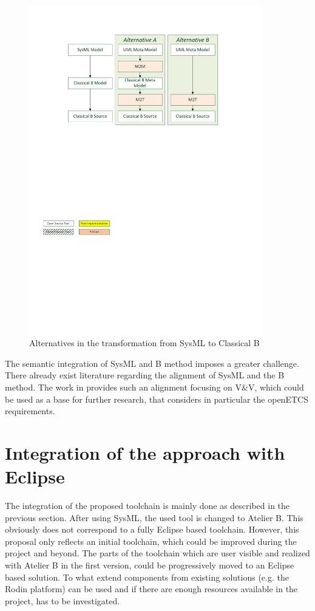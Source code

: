 \begin{figure}
  \centering
  \includegraphics[width=4in]{images/classical_b_transformation_alternatives.pdf}
  \caption{Alternatives in the transformation from SysML to Classical B}
  \label{fig:classical-b-transformation-alternatives}
\end{figure}

The semantic integration of SysML and B method imposes a greater
challenge. There already exist literature regarding the alignment of
SysML and the B method. The work in \citep{bousse}
provides such an alignment focusing on V\&V, which could be used as a
base for further research, that considers in particular the openETCS
requirements.


\section{Integration of the approach with Eclipse}

The integration of the proposed toolchain is mainly done as described
in the previous section. After using SysML, the used tool is changed
to Atelier B. This obviously does not correspond to a fully Eclipse
based toolchain. However, this proposal only reflects an initial
toolchain, which could be improved during the project and beyond. The
parts of the toolchain which are user visible and realized with
Atelier B in the first version, could be progressively moved to an
Eclipse based solution. To what extend components from existing
solutions (e.g. the Rodin platform) can be used and if there are
enough resources available in the project, has to be investigated.


